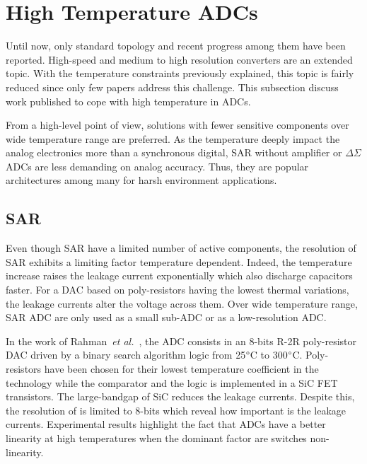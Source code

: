 \clearpage
\section{High Temperature ADCs}     %
\label{sec:high-temp-adc}
Until now, only standard topology and recent progress among them have been reported. High-speed and medium to high resolution converters are an extended topic. With the temperature constraints previously explained, this topic is fairly reduced since only few papers address this challenge. This subsection discuss work published to cope with high temperature in ADCs.

From a high-level point of view, solutions with fewer sensitive components over wide temperature range are preferred. As the temperature deeply impact the analog electronics more than a synchronous digital, SAR without amplifier or \(\Delta\Sigma \) ADCs are less demanding on analog accuracy. Thus, they are popular architectures among many for harsh environment applications.

\subsection{SAR}
Even though SAR have a limited number of active components, the resolution of SAR exhibits a limiting factor temperature dependent. Indeed, the temperature increase raises the leakage current exponentially which also discharge capacitors faster. For a DAC based on poly-resistors having the lowest thermal variations, the leakage currents alter the voltage across them. Over wide temperature range, SAR ADC are only used as a small sub-ADC or as a low-resolution ADC\@. %

In the work of Rahman~\textit{et al.}~\cite{Rahman2017}, the ADC consists in an 8-bits R-2R poly-resistor DAC driven by a binary search algorithm logic from 25\(\degree \)C to 300\(\degree \)C. Poly-resistors have been chosen for their lowest temperature coefficient in the technology while the comparator and the logic is implemented in a SiC FET transistors. The large-bandgap of SiC reduces the leakage currents. Despite this, the resolution of is limited to 8-bits which reveal how important is the leakage currents. Experimental results highlight the fact that ADCs have a better linearity at high temperatures when the dominant factor are switches non-linearity.

